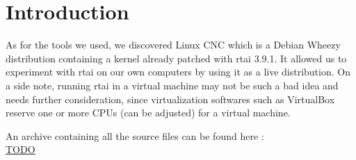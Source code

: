 \section{Introduction}

As for the tools we used, we discovered Linux CNC \cite{cite:linuxcnc} which is a Debian Wheezy distribution containing a kernel already patched with rtai 3.9.1. It allowed us to experiment with rtai on our own computers by using it as a live distribution. On a side note, running rtai in a virtual machine may not be such a bad idea and needs further consideration, since virtualization softwares such as VirtualBox reserve one or more CPUs (can be adjusted) for a virtual machine.\\

\begin{framehint}
    An archive containing all the source files can be found here :\\
    \href{TODO}{TODO} %
\end{framehint}
